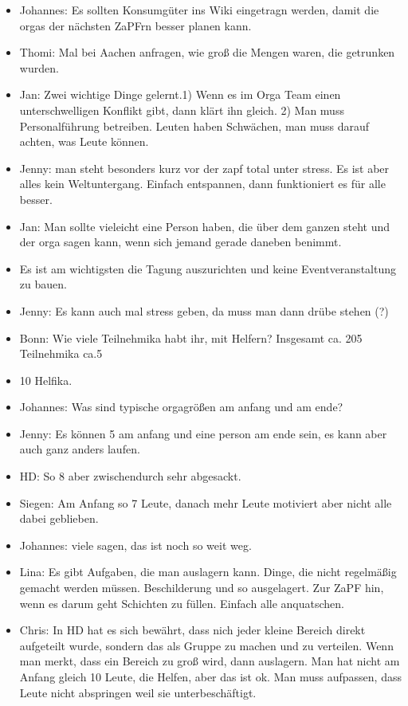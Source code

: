 \begin{itemize}
      \item Johannes: Es sollten Konsumgüter ins Wiki eingetragn werden, damit die orgas der nächsten ZaPFrn besser planen kann.
      \item Thomi: Mal bei Aachen anfragen, wie groß die Mengen waren, die getrunken wurden.
      \item Jan: Zwei wichtige Dinge gelernt.1) Wenn es im Orga Team einen unterschwelligen Konflikt gibt, dann klärt ihn gleich. 2) Man muss Personalführung betreiben. Leuten haben Schwächen, man muss darauf achten, was Leute können.
      \item Jenny: man steht besonders kurz vor der zapf total unter stress. Es ist aber alles kein Weltuntergang. Einfach entspannen, dann funktioniert es für alle besser.
      \item Jan: Man sollte vieleicht eine Person haben, die über dem ganzen steht und der orga sagen kann, wenn sich jemand gerade daneben benimmt.
      \item Es ist am wichtigsten die Tagung auszurichten und keine Eventveranstaltung zu bauen.
      \item Jenny: Es kann auch mal stress geben, da muss man dann drübe stehen (?)
      \item Bonn: Wie viele Teilnehmika habt ihr, mit Helfern? Insgesamt ca. 205 Teilnehmika ca.5\item10 Helfika.
      \item Johannes: Was sind typische orga\itemteam größen am anfang und am ende?
      \item Jenny: Es können 5 am anfang und eine person am ende sein, es kann aber auch ganz anders laufen.
      \item HD: So 8 aber zwischendurch sehr abgesackt.
      \item Siegen: Am Anfang so 7 Leute, danach mehr Leute motiviert aber nicht alle dabei geblieben.
      \item Johannes: viele sagen, das ist noch so weit weg.
      \item Lina: Es gibt Aufgaben, die man auslagern kann. Dinge, die nicht regelmäßig gemacht werden müssen. Beschilderung und so ausgelagert. Zur ZaPF hin, wenn es darum geht Schichten zu füllen. Einfach alle anquatschen.
      \item Chris: In HD hat es sich bewährt, dass nich jeder kleine Bereich direkt aufgeteilt wurde, sondern das als Gruppe zu machen und zu verteilen. Wenn man merkt, dass ein Bereich zu groß wird, dann auslagern. Man hat nicht am Anfang gleich 10 Leute, die Helfen, aber das ist ok. Man muss aufpassen, dass Leute nicht abspringen weil sie unterbeschäftigt.

\end{itemize}

